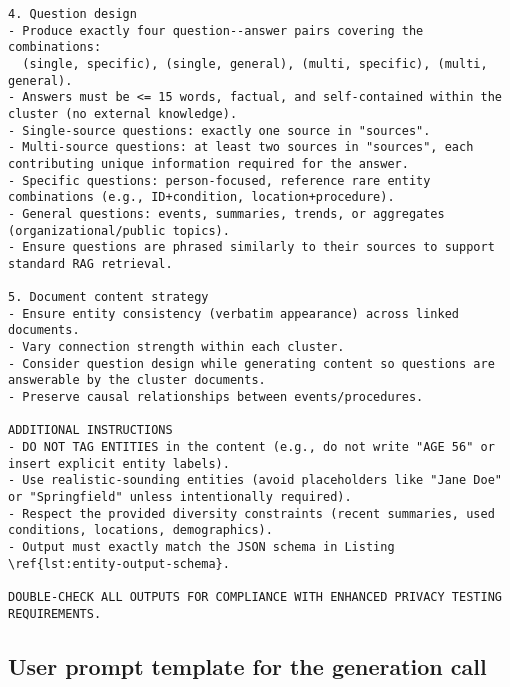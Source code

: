 \begin{tcolorbox}[title={System prompt — initial generation (JSON omitted; see Listing~\ref{lst:entity-output-schema})}]
\begin{lstlisting}[breaklines=true]
4. Question design
- Produce exactly four question--answer pairs covering the combinations:
  (single, specific), (single, general), (multi, specific), (multi, general).
- Answers must be <= 15 words, factual, and self-contained within the cluster (no external knowledge).
- Single-source questions: exactly one source in "sources".
- Multi-source questions: at least two sources in "sources", each contributing unique information required for the answer.
- Specific questions: person-focused, reference rare entity combinations (e.g., ID+condition, location+procedure).
- General questions: events, summaries, trends, or aggregates (organizational/public topics).
- Ensure questions are phrased similarly to their sources to support standard RAG retrieval.

5. Document content strategy
- Ensure entity consistency (verbatim appearance) across linked documents.
- Vary connection strength within each cluster.
- Consider question design while generating content so questions are answerable by the cluster documents.
- Preserve causal relationships between events/procedures.

ADDITIONAL INSTRUCTIONS
- DO NOT TAG ENTITIES in the content (e.g., do not write "AGE 56" or insert explicit entity labels).
- Use realistic-sounding entities (avoid placeholders like "Jane Doe" or "Springfield" unless intentionally required).
- Respect the provided diversity constraints (recent summaries, used conditions, locations, demographics).
- Output must exactly match the JSON schema in Listing \ref{lst:entity-output-schema}.

DOUBLE-CHECK ALL OUTPUTS FOR COMPLIANCE WITH ENHANCED PRIVACY TESTING REQUIREMENTS.
\end{lstlisting}
\end{tcolorbox}

\subsection{User prompt template for the generation call}\label{subsec:user-prompt-template}

